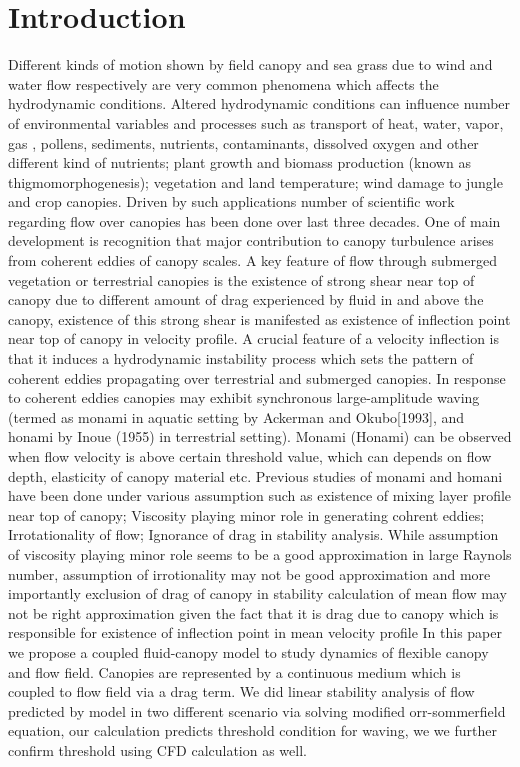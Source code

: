 \documentclass[aps,preprint,floatfix,prl]{revtex4-1}
\begin{document}
\section{Introduction}
Different kinds of motion shown by field canopy and sea grass due to wind and water flow respectively are very common 
phenomena which affects the hydrodynamic conditions. Altered hydrodynamic conditions can influence number of environmental 
variables and processes such as transport of heat, water, vapor, gas , pollens, sediments, nutrients, contaminants, dissolved oxygen 
and other different kind of nutrients; plant growth and biomass production (known as thigmomorphogenesis); vegetation and land temperature; 
wind damage to jungle and crop canopies. Driven by such applications number of scientific work regarding flow over canopies has been done over 
last three decades. One of main development is recognition that major contribution to canopy turbulence arises from coherent eddies
of canopy scales.\newline
A key feature of flow through submerged vegetation or terrestrial canopies is the existence of strong shear near top of canopy due to
different amount of drag experienced by fluid in and above the canopy, existence of this strong shear is manifested as
existence of inflection point near top of canopy in velocity profile. A crucial feature of a velocity inflection is that it induces a hydrodynamic instability
process which sets the pattern of coherent eddies propagating over terrestrial and submerged canopies. In response to coherent eddies canopies
may exhibit synchronous large-amplitude waving (termed as monami in aquatic setting by Ackerman and Okubo[1993], and honami by Inoue (1955) in terrestrial setting). 
Monami (Honami) can be observed when flow velocity is above certain threshold value, which can depends on flow depth, elasticity of canopy material
etc.\newline
Previous studies of monami and homani have been done under various assumption such as existence of mixing layer profile near top of canopy; Viscosity playing minor role 
in generating cohrent eddies; Irrotationality of flow; Ignorance of drag in stability analysis. While assumption of viscosity playing minor role seems to be 
a good approximation in large Raynols number, assumption of irrotionality may not be good approximation and more importantly exclusion of drag of canopy in stability 
calculation of mean flow may not be right approximation given the fact that it is drag due to canopy which is responsible for existence of inflection point in mean velocity
profile\newline     
In this paper we propose a coupled fluid-canopy model to study dynamics of flexible canopy and flow field. Canopies are represented by a continuous 
medium which is coupled to flow field via a drag term. We did linear stability analysis of flow predicted by model in two different scenario via solving 
modified orr-sommerfield equation, our calculation predicts threshold condition for waving, we we further confirm threshold using CFD calculation as well.
\end{document}
